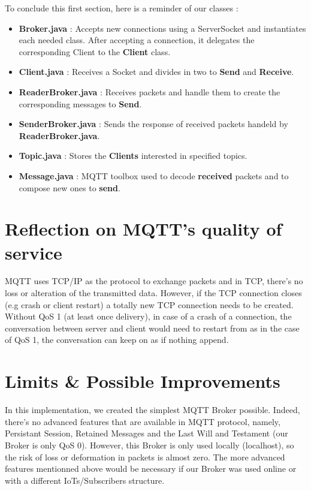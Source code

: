 \documentclass[12pt]{article}
\begin{document}
To conclude this first section, here is a reminder of our classes :
\begin{itemize}
	\item \textbf{Broker.java} : Accepts new connections using a ServerSocket and instantiates each needed class. After accepting a connection, it delegates 
	the corresponding Client to the \textbf{Client} class.
	\item \textbf{Client.java} : Receives a Socket and divides in two to \textbf{Send} and \textbf{Receive}.
	\item \textbf{ReaderBroker.java} : Receives packets and handle them to create the corresponding messages to \textbf{Send}.
	\item \textbf{SenderBroker.java} : Sends the response of received packets handeld by \textbf{ReaderBroker.java}.
	\item \textbf{Topic.java} : Stores the \textbf{Clients} interested in specified topics.
	\item \textbf{Message.java} : MQTT toolbox used to decode \textbf{received} packets and to compose new ones to \textbf{send}.
\end{itemize}

\section{Reflection on MQTT's quality of service}
MQTT uses TCP/IP as the protocol to exchange packets and in TCP, there's no loss or alteration of the transmitted data. However, if the TCP connection 
closes (e.g crash or client restart) a totally new TCP connection needs to be created. Without QoS 1 (at least once delivery), in case of a crash of a connection, 
the conversation between server and client would need to restart from as in the case of QoS 1, the conversation can keep on as if nothing append.

\section{Limits \& Possible Improvements}
In this implementation, we created the simplest MQTT Broker possible. Indeed, there's no advanced features that are available in MQTT protocol, namely, Persistant Session, 
Retained Messages and the Last Will and Testament (our Broker is only QoS 0). However, this Broker is only used locally (localhost), so the risk of loss or deformation in packets is almost zero. 
The more advanced features mentionned above would be necessary if our Broker was used online or with a different IoTs/Subscribers structure. 
\end{document}
